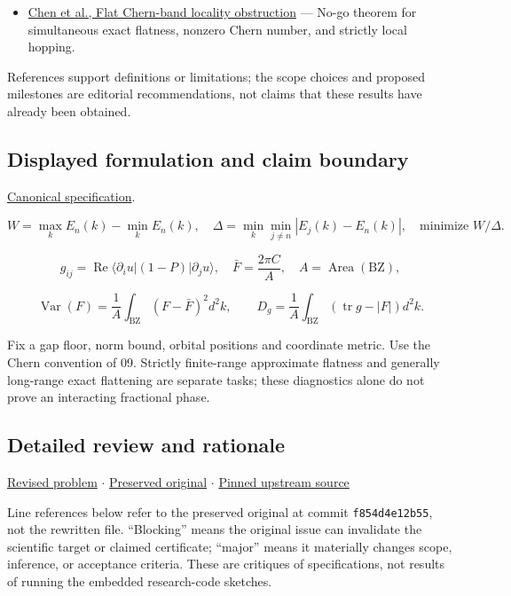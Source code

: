 \documentclass[
  11pt,
]{article}
\providecommand{\tightlist}{%
  \setlength{\itemsep}{0pt}\setlength{\parskip}{0pt}}
\begin{document}
\begin{itemize}
\tightlist
\item
  \href{https://arxiv.org/abs/1311.4956}{Chen et al., Flat Chern-band
  locality obstruction} --- No-go theorem for simultaneous exact
  flatness, nonzero Chern number, and strictly local hopping.
\end{itemize}

References support definitions or limitations; the scope choices and
proposed milestones are editorial recommendations, not claims that these
results have already been obtained.

\subsection{Displayed formulation and claim boundary}

\href{https://github.com/rick-stevens-ai/Pure-Thought/blob/main/PRDs/10-Flat-Chern-Bands.md}{Canonical
specification}.

\[W=\max_k E_n(k)-\min_k E_n(k),\quad
\Delta=\min_k\min_{j\ne n}|E_j(k)-E_n(k)|,\quad\text{minimize }W/\Delta.\]

\[g_{ij}=\operatorname{Re}\langle\partial_i u|(1-P)|\partial_j u\rangle,
\quad \bar F=\frac{2\pi C}{A},\quad A=\operatorname{Area}(\mathrm{BZ}),\]

\[\operatorname{Var}(F)=\frac1A\int_{\mathrm{BZ}}(F-\bar F)^2d^2k,
\qquad D_g=\frac1A\int_{\mathrm{BZ}}(\operatorname{tr}g-|F|)d^2k.\]

Fix a gap floor, norm bound, orbital positions and coordinate metric.
Use the Chern convention of 09. Strictly finite-range approximate
flatness and generally long-range exact flattening are separate tasks;
these diagnostics alone do not prove an interacting fractional phase.

\subsection{Detailed review and rationale}

\href{https://github.com/rick-stevens-ai/Pure-Thought/blob/main/PRDs/10-Flat-Chern-Bands.md}{Revised
problem} \ensuremath{\cdot}
\href{https://github.com/rick-stevens-ai/Pure-Thought/blob/main/archive/original-PRDs/10-Flat-Chern-Bands.md}{Preserved
original} \ensuremath{\cdot}
\href{https://github.com/rick-stevens-ai/Pure-Thought/blob/f854d4e12b55c1f5b5c2a964b75f2d23496d981e/PRDs/10-Flat-Chern-Bands.md}{Pinned
upstream source}

Line references below refer to the preserved original at commit
\texttt{f854d4e12b55}, not the rewritten file. ``Blocking'' means the
original issue can invalidate the scientific target or claimed
certificate; ``major'' means it materially changes scope, inference, or
acceptance criteria. These are critiques of specifications, not results
of running the embedded research-code sketches.
\end{document}
